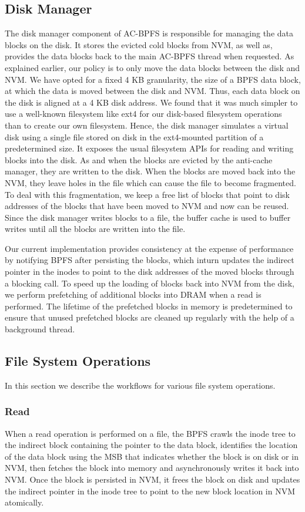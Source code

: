 \subsection{Disk Manager}
The disk manager component of AC-BPFS is responsible for managing the data blocks on the disk. It stores the evicted cold blocks from NVM, as well as, provides the data blocks back to the main AC-BPFS thread when requested. As explained earlier, our policy is to only move the data blocks between the disk and NVM. We have opted for a fixed 4 KB granularity, the size of a BPFS data block, at which the data is moved between the disk and NVM. Thus, each data block on the disk is aligned at a 4 KB disk address. We found that it was much simpler to use a well-known filesystem like ext4 for our disk-based filesystem operations than to create our own filesystem. Hence, the disk manager simulates a virtual disk using a single file stored on disk in the ext4-mounted partition of a predetermined size. It exposes the usual filesystem APIs for reading and writing blocks into the disk. As and when the blocks are evicted by the anti-cache manager, they are written to the disk. When the blocks are moved back into the NVM, they leave holes in the file which can cause the file to become fragmented. To deal with this fragmentation, we keep a free list of blocks that point to disk addresses of the blocks that have been moved to NVM and now can be reused. Since the disk manager writes blocks to a file, the buffer cache is used to buffer writes until all the blocks are written into the file.

Our current implementation provides consistency at the expense of performance by notifying BPFS after persisting the blocks, which inturn updates the indirect pointer in the inodes to point to the disk addresses of the moved blocks through a blocking call. To speed up the loading of blocks back into NVM from the disk, we perform prefetching of additional blocks into DRAM when a read is performed. The lifetime of the prefetched blocks in memory is predetermined to ensure that unused prefetched blocks are cleaned up regularly with the help of a background thread.

\subsection{File System Operations}
In this section we describe the workflows for various file system operations.
\subsubsection{Read}
When a read operation is performed on a file, the BPFS crawls the inode tree to the indirect block containing the pointer to the data block, identifies the location of the data block using the MSB that indicates whether the block is on disk or in NVM, then fetches the block into memory and asynchronously writes it back into NVM. Once the block is persisted in NVM, it frees the block on disk and updates the indirect pointer in the inode tree to point to the new block location in NVM atomically.

